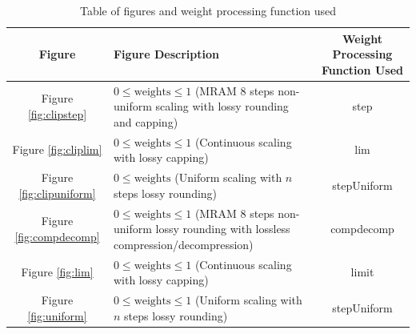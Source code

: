 \begin{table}[H]
	\centering
	\begin{tabular}[t]{cL{9.8cm}c}
		\hline
		Figure & Figure Description & Weight Processing Function Used\\
		\hline
		\hline
		Figure \ref{fig:clipstep} & $0 \leq \text{weights} \leq 1$ (MRAM 8 steps non-uniform scaling with lossy rounding and capping) & step\\
		Figure \ref{fig:cliplim} & $0 \leq \text{weights} \leq 1$ (Continuous scaling with lossy capping) & lim\\
		Figure \ref{fig:clipuniform} & $0 \leq \text{weights}$ (Uniform scaling with $n$ steps lossy rounding) & stepUniform\\
		Figure \ref{fig:compdecomp} & $0 \leq \text{weights} \leq 1$ (MRAM 8 steps non-uniform lossy rounding with lossless compression/decompression) &  compdecomp\\
		Figure \ref{fig:lim} & $0 \leq \text{weights} \leq 1$ (Continuous scaling with lossy capping) & limit\\
		Figure \ref{fig:uniform} & $0 \leq \text{weights} \leq 1$ (Uniform scaling with $n$ steps lossy rounding) & stepUniform\\
		\hline
	\end{tabular}
	\caption{Table of figures and weight processing function used}
	\label{tbl:fignwproc}
\end{table}
